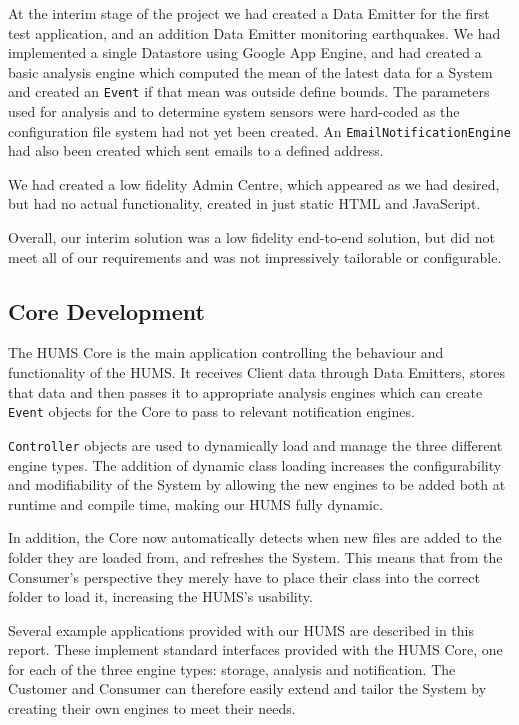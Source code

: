 \documentclass[10pt,a4paper]{article}
\begin{document}
At the interim stage of the project we had created a Data Emitter for the first test application, and an addition Data Emitter monitoring earthquakes. We had implemented a single Datastore using Google App Engine, and had created a basic analysis engine which computed the mean of the latest data for a System and created an \texttt{Event} if that mean was outside define bounds. The parameters used for analysis and to determine system sensors were hard-coded as the configuration file system had not yet been created. An \texttt{EmailNotificationEngine} had also been created which sent emails to a defined address. 

We had created a low fidelity  Admin Centre, which appeared as we had desired, but had no actual functionality, created in just static HTML and JavaScript.

Overall, our interim solution was a low fidelity end-to-end solution, but did not meet all of our requirements and was not impressively tailorable or configurable. 

\subsection{Core Development}
\label{sec:core}
 
The HUMS Core is the main application controlling the behaviour and functionality of the HUMS. It receives Client data through Data Emitters, stores that data and then passes it to appropriate analysis engines which can create \texttt{Event} objects for the Core to pass to relevant notification engines.

\texttt{Controller} objects are used to dynamically load and manage the three different engine types. The addition of dynamic class loading increases the configurability and modifiability of the System by allowing the new engines to be added both at runtime and compile time, making our HUMS fully dynamic.

In addition, the Core now automatically detects when new files are added to the folder they are loaded from, and refreshes the System. This means that from the Consumer's perspective they merely have to place their class into the correct folder to load it, increasing the HUMS's usability.

Several example applications provided with our HUMS are described in this report. These implement standard interfaces provided with the HUMS Core, one for each of the three engine types: storage, analysis and notification. The Customer and Consumer can therefore easily extend and tailor the System by creating their own engines to meet their needs.
\end{document}
